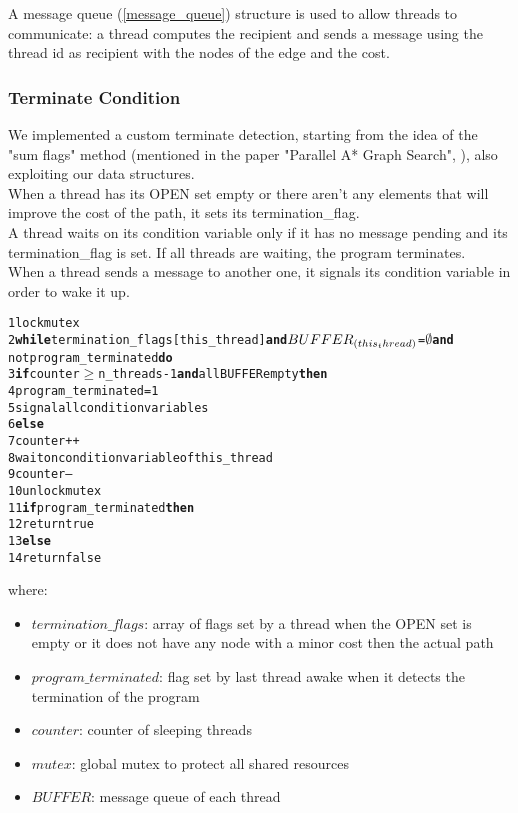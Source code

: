 A message queue (\ref{message_queue}) structure is used to allow threads to communicate: a thread computes the recipient and sends a message using the thread id as recipient with the nodes of the edge and the cost. 

\subsubsection{Terminate Condition}
\label{terminate}

We implemented a custom terminate detection, starting from the idea of the "sum flags" method (mentioned in the paper "Parallel A* Graph Search", \cite{bibCustomTerm}), also exploiting our data structures.
\\
When a thread has its OPEN set empty or there aren't any elements that will improve the cost of the path, it sets its termination\_flag.
\\
A thread waits on its condition variable only if it has no message pending and its termination\_flag is set. If all threads are waiting, the program terminates.
\\
When a thread sends a message to another one, it signals its condition variable in order to wake it up.

\begin{alltt}
    1 lock mutex
    2{\bf while} termination_flags[this_thread] {\bf and} \(BUFFER\sb{(this_thread)}\) = \(\emptyset\) {\bf and}
            not program_terminated {\bf do}
    3    {\bf if} counter \( \geq \) n_threads - 1 {\bf and} all BUFFER empty {\bf then}
    4        program_terminated = 1
    5        signal all condition variables
    6    {\bf else}
    7        counter++
    8        wait on condition variable of this_thread
    9        counter--
    10 unlock mutex
    11{\bf if} program_terminated {\bf then}
    12   return true
    13{\bf else}
    14   return false
\end{alltt}

where:
\begin{itemize}
    \item $termination\_flags$: array of flags set by a thread when the OPEN set is empty or it does not have any node with a minor cost then the actual path
    \item $program\_terminated$: flag set by last thread awake when it detects the termination of the program
    \item $counter$: counter of sleeping threads
    \item $mutex$: global mutex to protect all shared resources
    \item $BUFFER$: message queue of each thread
\end{itemize}

